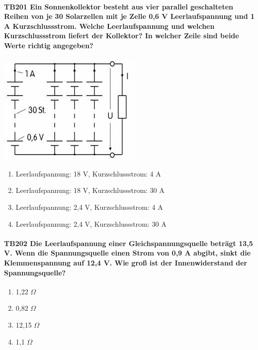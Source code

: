 \documentclass[8pt]{article}
\begin{document}
\begin{enumerate}
\paragraph*{TB201 Ein Sonnenkollektor besteht aus vier parallel geschalteten Reihen von je 30 Solarzellen mit je Zelle 0,6 V Leerlaufspannung und 1 A Kurzschlussstrom. Welche Leerlaufspannung und welchen Kurzschlussstrom liefert der Kollektor? In welcher Zeile sind beide Werte richtig angegeben?}
\begin{center}
	\begin{minipage}{\linewidth}
		\centering
		\includegraphics[scale=0.7]{pics/tb201_a.jpg}
	\end{minipage}
\end{center}
\begin{enumerate}[nolistsep,label=\Alph*]
\item Leerlaufspannung: 18 V, Kurzschlussstrom: 4 A
\item Leerlaufspannung: 18 V, Kurzschlussstrom: 30 A
\item Leerlaufspannung: 2,4 V, Kurzschlussstrom: 4 A
\item Leerlaufspannung: 2,4 V, Kurzschlussstrom: 30 A
\end{enumerate}



\paragraph*{TB202 Die Leerlaufspannung einer Gleichspannungsquelle beträgt 13,5 V. Wenn die Spannungsquelle einen Strom von 0,9 A abgibt, sinkt die Klemmenspannung auf 12,4 V. Wie groß ist der Innenwiderstand der Spannungsquelle?}
\begin{enumerate}[nolistsep,label=\Alph*]
\item 1,22 $\Omega$
\item 0,82 $\Omega$
\item 12,15 $\Omega$
\item 1,1 $\Omega$
\end{enumerate}




\end{enumerate}
\end{document}
